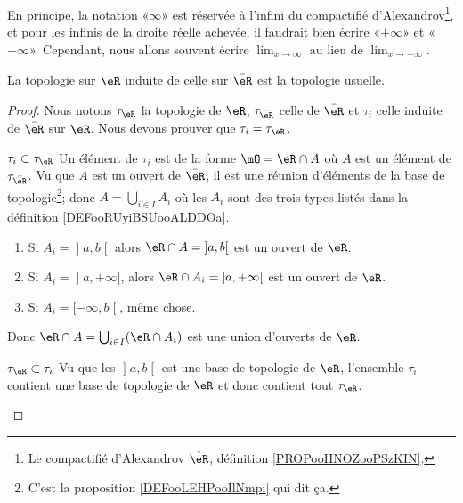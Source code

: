 \begin{normaltext}
    En principe, la notation «\( \infty\)» est réservée à l'infini du compactifié d'Alexandrov\footnote{Le compactifié d'Alexandrov \( \hat \eR\), définition \ref{PROPooHNOZooPSzKIN}.}, et pour les infinis de la droite réelle achevée, il faudrait bien écrire «\( +\infty\)» et «\( -\infty\)». Cependant, nous allons souvent écrire \( \lim_{x\to \infty} \) au lieu de \( \lim_{x\to +\infty} \).
\end{normaltext}

\begin{lemma}
    La topologie sur \( \eR\) induite de celle sur \( \bar \eR\) est la topologie usuelle.
\end{lemma}

\begin{proof}
    Nous notons \( \tau_{\eR}\) la topologie de \( \eR\), \( \tau_{\bar \eR}\) celle de \( \bar \eR\) et \( \tau_i\) celle induite de \( \bar \eR\) sur \( \eR\). Nous devons prouver que \( \tau_i=\tau_{\eR}\).
    
    \begin{subproof}
        \item[\( \tau_i\subset\tau_{\eR}\)]
            Un élément de \( \tau_i\) est de la forme \( \mO=\eR\cap A\) où \( A\) est un élément de \( \tau_{\bar \eR}\). Vu que \( A\) est un ouvert de \( \bar \eR\), il est une réunion d'éléments de la base de topologie\footnote{C'est la proposition \ref{DEFooLEHPooIlNmpi} qui dit ça.}; donc \( A=\bigcup_{i\in I}A_i\) où les \( A_i\) sont des trois types listés dans la définition \ref{DEFooRUyiBSUooALDDOa}.
            \begin{enumerate}
                \item
                Si \( A_i=\mathopen] a , b \mathclose[\) alors \( \eR\cap A=\mathopen] a , b \mathclose[\) est un ouvert de \( \eR\).
            \item Si \( A_i=\mathopen] a , +\infty \mathclose]\), alors \( \eR\cap A_i=\mathopen] a , +\infty \mathclose[\) est un ouvert de \( \eR\).
                \item Si \( A_i=\mathopen[ -\infty , b \mathclose[\), même chose.
            \end{enumerate}
            Donc \( \eR\cap A=\bigcup_{i\in I}(\eR\cap A_i)\) est une union d'ouverts de \( \eR\).
        \item[\( \tau_{\eR}\subset\tau_i\)]
        Vu que les \( \mathopen] a , b \mathclose[\) est une base de topologie de \( \eR\), l'ensemble \( \tau_i\) contient une base de topologie de \( \eR\) et donc contient tout \( \tau_{\eR}\).
    \end{subproof}
\end{proof}

